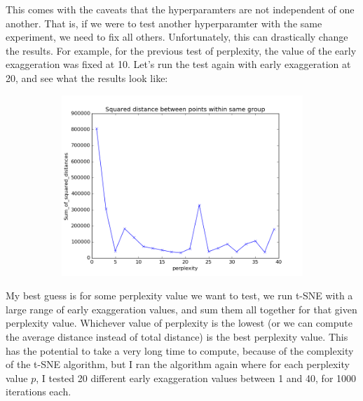 \documentclass[20pt]{article} %
\begin{document}
\newpage
This comes with the caveats that the hyperparamters are not independent of one another.  That is, if we were to test another hyperparamter with the same experiment, we need to fix all others.  Unfortunately, this can drastically change the results. For example, for the previous test of perplexity, the value of the early exaggeration was fixed at 10.  Let's run the test again with early exaggeration at 20, and see what the results look like:
\begin{figure}[!htbp]
  	\centering
   	\begin{subfigure}[p]{0.6\linewidth}
    	\includegraphics[width=\linewidth]{./figures/optimal_perp1.png}
   	\end{subfigure}
\end{figure}
My best guess is for some perplexity value we want to test, we run t-SNE with a large range of early exaggeration values, and sum them all together for that given perplexity value.  Whichever value of perplexity is the lowest (or we can compute the average distance instead of total distance) is the best perplexity value. This has the potential to take a very long time to compute, because of the complexity of the t-SNE algorithm, but I ran the algorithm again where for each perplexity value $p$, I tested 20 different early exaggeration values between 1 and 40, for 1000 iterations each.
\end{document}
